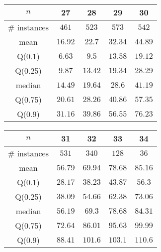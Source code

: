 \begin{tabular}{c|cccc} 
\hline 
$n$ & 27 & 28 & 29 & 30 \tabularnewline 
\hline 
\hline 
\# instances & $461$ & $523$ & $573$ & $542$ \tabularnewline 
mean & $16.92$ & $22.7$ & $32.34$ & $44.89$ \tabularnewline 
Q(0.1) & $6.63$ & $9.5$ & $13.58$ & $19.12$ \tabularnewline 
Q(0.25) & $9.87$ & $13.42$ & $19.34$ & $28.29$ \tabularnewline 
median & $14.49$ & $19.64$ & $28.6$ & $41.19$ \tabularnewline 
Q(0.75) & $20.61$ & $28.26$ & $40.86$ & $57.35$ \tabularnewline 
Q(0.9) & $31.16$ & $39.86$ & $56.55$ & $76.23$ \tabularnewline 
\hline 
\end{tabular} 
\medskip{} 

\begin{tabular}{c|cccc} 
\hline 
$n$ & 31 & 32 & 33 & 34 \tabularnewline 
\hline 
\hline 
\# instances & $531$ & $340$ & $128$ & $36$ \tabularnewline 
mean & $56.79$ & $69.94$ & $78.68$ & $85.16$ \tabularnewline 
Q(0.1) & $28.17$ & $38.23$ & $43.87$ & $56.3$ \tabularnewline 
Q(0.25) & $38.09$ & $54.66$ & $62.38$ & $73.06$ \tabularnewline 
median & $56.19$ & $69.3$ & $78.68$ & $84.31$ \tabularnewline 
Q(0.75) & $72.64$ & $86.01$ & $95.63$ & $99.99$ \tabularnewline 
Q(0.9) & $88.41$ & $101.6$ & $103.1$ & $110.6$ \tabularnewline 
\hline 
\end{tabular} 
\medskip{} 

